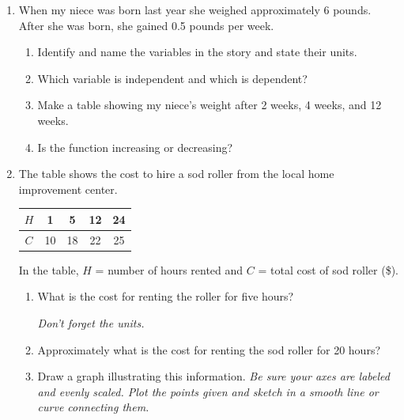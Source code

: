 \documentclass[12pt]{article}
\begin{document}
\begin{enumerate}

\item When my niece was born last year she weighed approximately 6 pounds.  After she was born, she gained 0.5 pounds per week.

\begin{enumerate}
\item Identify and name the variables in the story and state their units.
\vfill
\item Which variable is independent and which is dependent?
\vfill
\item Make a table showing my niece's weight after 2 weeks, 4 weeks, and 12 weeks.
\vfill
\vfill
\vfill
\item Is the function increasing or decreasing?
\vfill
\end{enumerate}

\newpage

\item The table shows the cost to hire a sod roller from the local home improvement center.  

\begin{center}
\begin{tabular} {|c|c|c|c|c|} \hline
$H$ & 1 & 5 & 12 & 24 \\ \hline
$C$ & 10 & 18 & 22 & 25 \\ \hline
\end{tabular}
\end{center}

In the table, $H$ = number of hours rented and $C$ = total cost of sod roller  (\$).

\begin{enumerate}
\item What is the cost for renting the roller for five hours?

\emph{Don't forget the units.}
\vfill
\item Approximately what is the cost for renting the sod roller for 20 hours?
\vfill
\item Draw a graph illustrating this information.  \emph{Be sure your axes are labeled and evenly scaled.  Plot the points given and sketch in a smooth line or curve connecting them.}


\end{enumerate}
\end{enumerate}
\end{document}
